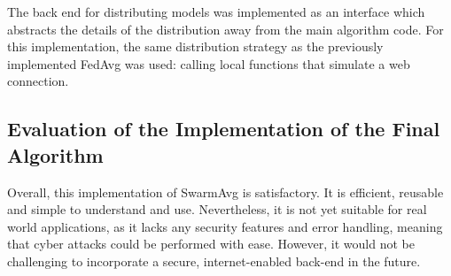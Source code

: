 The back end for distributing models was implemented as an interface which abstracts the details of the distribution away from the main algorithm code. For this implementation, the same distribution strategy as the previously implemented FedAvg was used: calling local functions that simulate a web connection.

\subsection{Evaluation of the Implementation of the Final Algorithm}
Overall, this implementation of SwarmAvg is satisfactory. It is efficient, reusable and simple to understand and use. Nevertheless, it is not yet suitable for real world applications, as it lacks any security features and error handling, meaning that cyber attacks could be performed with ease. However, it would not be challenging to incorporate a secure, internet-enabled back-end in the future.